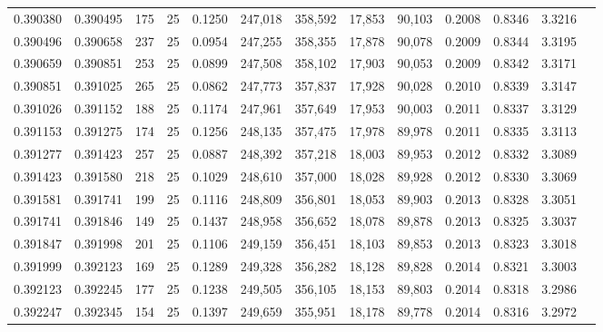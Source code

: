 \begin{tabular}{rrrrrrrrrrrrr}
0.390380 & 0.390495 &   175 &  25 &                                     0.1250 & 247,018 & 358,592 &  17,853 &  90,103 & 0.2008 & 0.8346 & 3.3216 \\
0.390496 & 0.390658 &   237 &  25 &                                     0.0954 & 247,255 & 358,355 &  17,878 &  90,078 & 0.2009 & 0.8344 & 3.3195 \\
0.390659 & 0.390851 &   253 &  25 &                                     0.0899 & 247,508 & 358,102 &  17,903 &  90,053 & 0.2009 & 0.8342 & 3.3171 \\
0.390851 & 0.391025 &   265 &  25 &                                     0.0862 & 247,773 & 357,837 &  17,928 &  90,028 & 0.2010 & 0.8339 & 3.3147 \\
0.391026 & 0.391152 &   188 &  25 &                                     0.1174 & 247,961 & 357,649 &  17,953 &  90,003 & 0.2011 & 0.8337 & 3.3129 \\
0.391153 & 0.391275 &   174 &  25 &                                     0.1256 & 248,135 & 357,475 &  17,978 &  89,978 & 0.2011 & 0.8335 & 3.3113 \\
0.391277 & 0.391423 &   257 &  25 &                                     0.0887 & 248,392 & 357,218 &  18,003 &  89,953 & 0.2012 & 0.8332 & 3.3089 \\
0.391423 & 0.391580 &   218 &  25 &                                     0.1029 & 248,610 & 357,000 &  18,028 &  89,928 & 0.2012 & 0.8330 & 3.3069 \\
0.391581 & 0.391741 &   199 &  25 &                                     0.1116 & 248,809 & 356,801 &  18,053 &  89,903 & 0.2013 & 0.8328 & 3.3051 \\
0.391741 & 0.391846 &   149 &  25 &                                     0.1437 & 248,958 & 356,652 &  18,078 &  89,878 & 0.2013 & 0.8325 & 3.3037 \\
0.391847 & 0.391998 &   201 &  25 &                                     0.1106 & 249,159 & 356,451 &  18,103 &  89,853 & 0.2013 & 0.8323 & 3.3018 \\
0.391999 & 0.392123 &   169 &  25 &                                     0.1289 & 249,328 & 356,282 &  18,128 &  89,828 & 0.2014 & 0.8321 & 3.3003 \\
0.392123 & 0.392245 &   177 &  25 &                                     0.1238 & 249,505 & 356,105 &  18,153 &  89,803 & 0.2014 & 0.8318 & 3.2986 \\
0.392247 & 0.392345 &   154 &  25 &                                     0.1397 & 249,659 & 355,951 &  18,178 &  89,778 & 0.2014 & 0.8316 & 3.2972 \\

\end{tabular}
